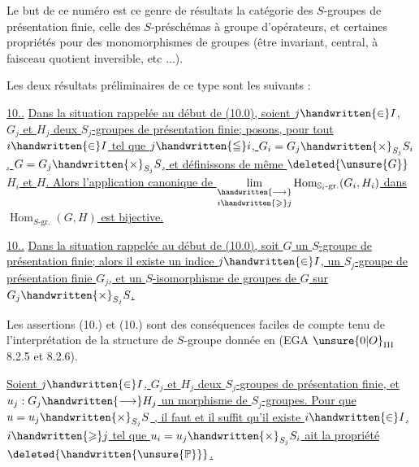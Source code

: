 Le but de ce numéro est  ce genre de résultats  la catégorie des $S$-groupes de présentation finie,  celle des $S$-préschémas à groupe d'opérateurs, et  certaines propriétés pour des monomorphismes de groupes (être invariant, central, à faisceau quotient inversible, etc ...).

Les deux résultats préliminaires de ce type sont les suivants :

\uline{10..}  \uline{Dans la situation rappelée au début de (10.0), soient  $j\handwritten{\in}I$, $G_j$ et $H_j$ deux $S_j$-groupes de présentation finie; posons, pour tout $i\handwritten{\in}I$ tel que $j\handwritten{\leqq}i$, $G_i=G_j\handwritten{\times}_{S_j}S_i$, $G=G_j\handwritten{\times}_{S_j}S$, et définissons de même $\deleted{\unsure{G}}$ $H_i$ et $H$. Alors l'application canonique de $\underset{i\handwritten{\geqslant}j}{\underset{\handwritten{\longrightarrow}}{\lim}}\operatorname{Hom}_{\mathbb{S}_i\text{-gr.}}(G_i,H_i)$ dans $\operatorname{Hom}_{S\text{-gr.}}(G,H)$ est bijective.}

\uline{10..}  \uline{Dans la situation rappelée au début de (10.0), soit $G$ un $S$-groupe de présentation finie; alors il existe un indice $j\handwritten{\in}I$,  un $S_j$-groupe de présentation  finie $G_j$, et un  $S$-isomorphisme de groupes de $G$ sur $G_j\handwritten{\times}_{S_j}S$.}

Les assertions (10.) et (10.) sont des conséquences faciles de  compte tenu de l'interprétation de la structure de $S$-groupe donnée en (EGA $\unsure{0|O}_{\mathrm{III}}$ 8.2.5 et 8.2.6).




 \uline{Soient $j\handwritten{\in}I$, $G_j$ et $H_j$ deux $S_j$-groupes de présentation finie, et $u_j:G_j\handwritten{\longrightarrow}H_j$ un morphisme de $S_j$-groupes. Pour que $u=u_j\handwritten{\times}_{S_j}S$ , il faut et il suffit qu'il existe $i\handwritten{\in}I$, $i\handwritten{\geqslant}j$ tel que $u_i=u_j\handwritten{\times}_{S_j}S_i$ ait la propriété $\deleted{\handwritten{\unsure{\mathbb{P}}}}$.}

